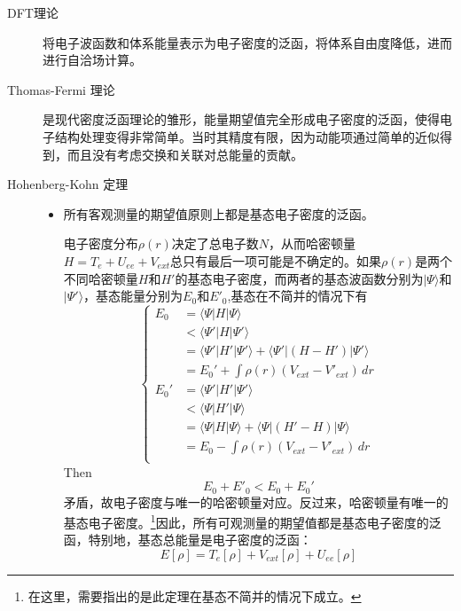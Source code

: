 \documentclass[12pt,a4paper,openany,twoside]{book}
\numberwithin{equation}{section}
\newcommand{\ket}[1]{| #1 \rangle}
\newcommand{\bracketl}[3]{\langle #1 | #2 | #3 \rangle}
\begin{document}
  \begin{description}
    \item[DFT理论]将电子波函数和体系能量表示为电子密度的泛函，将体系自由度降低，进而进行自洽场计算。
    
    \item[Thomas-Fermi 理论]
      是现代密度泛函理论的雏形，能量期望值完全形成电子密度的泛函，使得电子结构处理变得非常简单。当时其精度有限，因为动能项通过简单的近似得到，而且没有考虑交换和关联对总能量的贡献。
    \item[Hohenberg-Kohn 定理]
    \begin{itemize}
      \item 所有客观测量的期望值原则上都是基态电子密度的泛函。
  
      电子密度分布$\rho(r)$决定了总电子数$N$，从而哈密顿量$H=T_e+U_{ee}+V_{ext}$总只有最后一项可能是不确定的。如果$\rho(r)$是两个不同哈密顿量$H$和$H'$的基态电子密度，而两者的基态波函数分别为$\ket{\Psi}$和$\ket{\Psi'}$，基态能量分别为$E_0$和$E'_0$,基态在不简并的情况下有
      \begin{equation}
      \begin{cases}
      E_0&=\bracketl{\Psi}{H}{\Psi}\\
      &<\bracketl{\Psi'}{H}{\Psi'}\\
      &=\bracketl{\Psi'}{H'}{\Psi'}+\bracketl{\Psi'}{(H-H')}{\Psi'}\\
      &=E_0'+\int \rho(r)(V_{ext}-V'_{ext})\,dr\\
      E_0'&=\bracketl{\Psi'}{H'}{\Psi'}\\&
      <\bracketl{\Psi}{H'}{\Psi}\\
      &=\bracketl{\Psi}{H}{\Psi}+\bracketl{\Psi}{(H'-H)}{\Psi}\\
      &=E_0-\int \rho(r)(V_{ext}-V'_{ext})\,dr\\
      \end{cases}
      \end{equation}
      Then
      \begin{equation}
      E_0+E'_0<E_0+E_0'
      \end{equation}
      矛盾，故电子密度与唯一的哈密顿量对应。反过来，哈密顿量有唯一的基态电子密度。\footnote{在这里，需要指出的是此定理在基态不简并的情况下成立。}因此，所有可观测量的期望值都是基态电子密度的泛函，特别地，基态总能量是电子密度的泛函：
      \begin{equation}
      E[\rho]=T_e[\rho]+V_{ext}[\rho]+U_{ee}[\rho]
      \end{equation}
  

\end{itemize}
\end{description}
\end{document}
